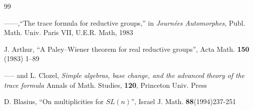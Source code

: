 \documentclass[12pt,letterpaper,openany]{book}
\theoremstyle{plain}
\theoremstyle{definition}
\theoremstyle{remark}
\theoremstyle{remark}
\begin{document}
\begin{thebibliography}{99}



 ------,``The trace formula for reductive groups,'' in
\emph{Journ\'ees Automorphes}, Publ. Math. Univ. Paris VII,
U.E.R. Math, 1983


 J. Arthur, ``A Paley--Wiener theorem for real reductive
groups'', Acta Math. \textbf{150} (1983) 1--89

 ----- and L. Clozel, \emph{Simple algebras,
base change, and the advanced} \emph{theory of the trace formula}
Annals of Math. Studies, \textbf{120}, Princeton Univ. Press








 D. Blasius, ``On multiplicities for $SL(n)$'',
Israel J. Math. \textbf{88}(1994)237-251


\end{thebibliography}
\end{document}
